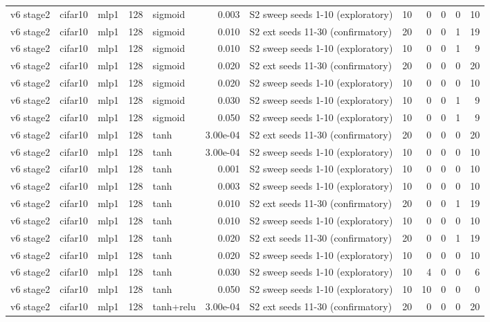 \begin{table}[htbp]
{\begin{tabular}{@{}lllrlrlrrrrr@{}}
v6 stage2 & cifar10 & mlp1 & 128 & sigmoid & 0.003 & S2 sweep seeds 1-10 (exploratory) & 10 & 0 & 0 & 0 & 10 \\
v6 stage2 & cifar10 & mlp1 & 128 & sigmoid & 0.010 & S2 ext seeds 11-30 (confirmatory) & 20 & 0 & 0 & 1 & 19 \\
v6 stage2 & cifar10 & mlp1 & 128 & sigmoid & 0.010 & S2 sweep seeds 1-10 (exploratory) & 10 & 0 & 0 & 1 & 9 \\
v6 stage2 & cifar10 & mlp1 & 128 & sigmoid & 0.020 & S2 ext seeds 11-30 (confirmatory) & 20 & 0 & 0 & 0 & 20 \\
v6 stage2 & cifar10 & mlp1 & 128 & sigmoid & 0.020 & S2 sweep seeds 1-10 (exploratory) & 10 & 0 & 0 & 0 & 10 \\
v6 stage2 & cifar10 & mlp1 & 128 & sigmoid & 0.030 & S2 sweep seeds 1-10 (exploratory) & 10 & 0 & 0 & 1 & 9 \\
v6 stage2 & cifar10 & mlp1 & 128 & sigmoid & 0.050 & S2 sweep seeds 1-10 (exploratory) & 10 & 0 & 0 & 1 & 9 \\
v6 stage2 & cifar10 & mlp1 & 128 & tanh & 3.00e-04 & S2 ext seeds 11-30 (confirmatory) & 20 & 0 & 0 & 0 & 20 \\
v6 stage2 & cifar10 & mlp1 & 128 & tanh & 3.00e-04 & S2 sweep seeds 1-10 (exploratory) & 10 & 0 & 0 & 0 & 10 \\
v6 stage2 & cifar10 & mlp1 & 128 & tanh & 0.001 & S2 sweep seeds 1-10 (exploratory) & 10 & 0 & 0 & 0 & 10 \\
v6 stage2 & cifar10 & mlp1 & 128 & tanh & 0.003 & S2 sweep seeds 1-10 (exploratory) & 10 & 0 & 0 & 0 & 10 \\
v6 stage2 & cifar10 & mlp1 & 128 & tanh & 0.010 & S2 ext seeds 11-30 (confirmatory) & 20 & 0 & 0 & 1 & 19 \\
v6 stage2 & cifar10 & mlp1 & 128 & tanh & 0.010 & S2 sweep seeds 1-10 (exploratory) & 10 & 0 & 0 & 0 & 10 \\
v6 stage2 & cifar10 & mlp1 & 128 & tanh & 0.020 & S2 ext seeds 11-30 (confirmatory) & 20 & 0 & 0 & 1 & 19 \\
v6 stage2 & cifar10 & mlp1 & 128 & tanh & 0.020 & S2 sweep seeds 1-10 (exploratory) & 10 & 0 & 0 & 0 & 10 \\
v6 stage2 & cifar10 & mlp1 & 128 & tanh & 0.030 & S2 sweep seeds 1-10 (exploratory) & 10 & 4 & 0 & 0 & 6 \\
v6 stage2 & cifar10 & mlp1 & 128 & tanh & 0.050 & S2 sweep seeds 1-10 (exploratory) & 10 & 10 & 0 & 0 & 0 \\
v6 stage2 & cifar10 & mlp1 & 128 & tanh+relu & 3.00e-04 & S2 ext seeds 11-30 (confirmatory) & 20 & 0 & 0 & 0 & 20 \\

\end{tabular}}
\end{table}
